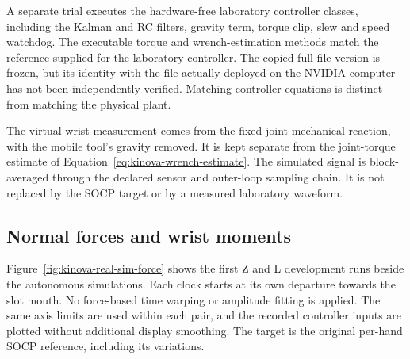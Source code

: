 A separate trial executes the hardware-free laboratory controller classes, including the Kalman and RC filters, gravity term, torque clip, slew and speed watchdog. The executable torque and wrench-estimation methods match the reference supplied for the laboratory controller. The copied full-file version is frozen, but its identity with the file actually deployed on the NVIDIA computer has not been independently verified. Matching controller equations is distinct from matching the physical plant.

The virtual wrist measurement comes from the fixed-joint mechanical reaction, with the mobile tool's gravity removed. It is kept separate from the joint-torque estimate of Equation~\eqref{eq:kinova-wrench-estimate}. The simulated signal is block-averaged through the declared sensor and outer-loop sampling chain. It is not replaced by the SOCP target or by a measured laboratory waveform.

\subsection{Normal forces and wrist moments}

Figure~\ref{fig:kinova-real-sim-force} shows the first Z and L development runs beside the autonomous simulations. Each clock starts at its own departure towards the slot mouth. No force-based time warping or amplitude fitting is applied. The same axis limits are used within each pair, and the recorded controller inputs are plotted without additional display smoothing. The target is the original per-hand SOCP reference, including its variations.



